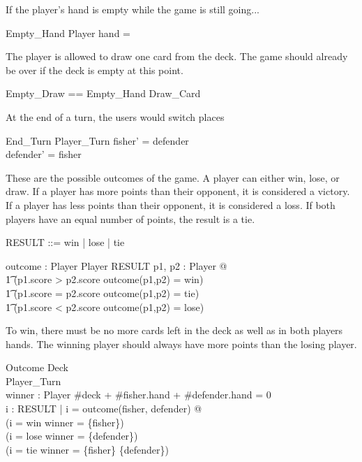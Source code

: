\documentclass{article}
\begin{document}
If the player's hand is empty while the game is still going...
\begin{schema}{Empty\_Hand}
    \Xi Player
    \where
    hand = \emptyset
\end{schema}

The player is allowed to draw one card from the deck. The game should already
be over if the deck is empty at this point.
\begin{zed}
    Empty\_Draw == Empty\_Hand \land Draw\_Card
\end{zed}


At the end of a turn, the users would switch places
\begin{schema}{End\_Turn}
    \Delta Player\_Turn
    \where
    fisher' = defender \\
    defender' = fisher
\end{schema}


These are the possible outcomes of the game. A player can
either win, lose, or draw. If a player has more points than their
opponent, it is considered a victory. If a player has less points
than their opponent, it is considered a loss. If both players have
an equal number of points, the result is a tie.
\begin{zed}
    RESULT ::= win | lose | tie
\end{zed}

\begin{axdef}
    outcome : Player \cross Player \fun RESULT
    \where
    \forall p1, p2 : Player @\\
    \t1 (p1.score > p2.score \land outcome(p1,p2) = win) \lor \\
    \t1 (p1.score = p2.score \land outcome(p1,p2) = tie) \lor \\
    \t1 (p1.score < p2.score \land outcome(p1,p2) = lose)
\end{axdef}

To win, there must be no more cards left in the deck as well as
in both players hands. The winning player should always have more
points than the losing player.
\begin{schema}{Outcome}
    Deck \\
    Player\_Turn\\
    winner : \power Player
    \where
    \#deck + \#fisher.hand + \#defender.hand = 0 \\
    \forall i : RESULT | i = outcome(fisher, defender) @\\
    (i = win \land winner = \{fisher\}) \lor \\
    (i = lose \land winner = \{defender\}) \lor \\
    (i = tie \land winner = \{fisher\} \cup \{defender\})
\end{schema}
\end{document}
